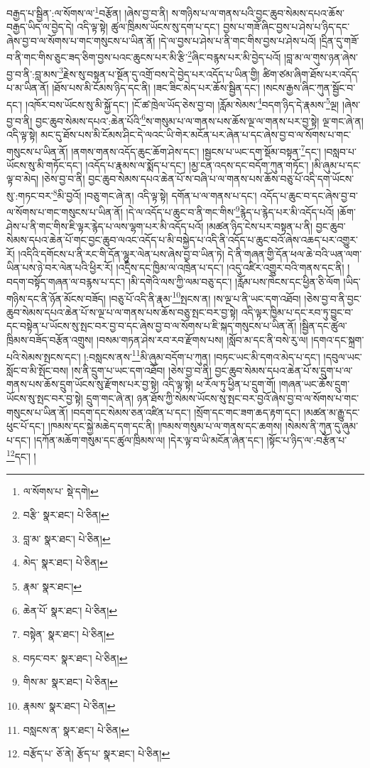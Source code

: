 བརྒྱད་པ་སྦྱིན་:ལ་སོགས་ལ་\footnote{ལ་སོགས་པ་  སྡེ་དགེ། }བརྩོན། །ཞེས་བྱ་བ་ནི། ས་གཉིས་པ་ལ་གནས་པའི་བྱང་ཆུབ་སེམས་དཔའ་ཆོས་བརྒྱད་ཡིད་ལ་བྱེད་དེ། འདི་ལྟ་སྟེ། ཚུལ་ཁྲིམས་ཡོངས་སུ་དག་པ་དང་། བྱས་པ་གཟོ་ཞིང་བྱས་པ་ཤེས་པ་ཉིད་དང་ཞེས་བྱ་བ་ལ་སོགས་པ་གང་གསུངས་པ་ཡིན་ནོ། །དེ་ལ་བྱས་པ་ཤེས་པ་ནི་གང་གིས་བྱས་པ་ཤེས་པའོ། །དྲིན་དུ་གཟོ་བ་ནི་གང་གིས་ཅུང་ཟད་ཅིག་བྱས་པའང་ཆུངས་པར་མི་རྩི་\footnote{བརྩི་  སྣར་ཐང་།  པེ་ཅིན། }ཞིང་བརྙས་པར་མི་བྱེད་པའོ། །བླ་མ་ལ་གུས་ཉན་ཞེས་བྱ་བ་ནི་:བླ་མས་\footnote{བླ་མ་  སྣར་ཐང་།  པེ་ཅིན། }རྗེས་སུ་བསྟན་པ་སྔོན་དུ་འགྲོ་བས་དེ་བྱེད་པར་འདོད་པ་ཡིན་གྱི། ཚིག་ཙམ་ཞིག་ཐོས་པར་འདོད་པ་མ་ཡིན་ནོ། །ཐོས་པས་མི་ངོམས་ཉིད་དང་ནི། །ཟང་ཟིང་མེད་པར་ཆོས་སྦྱིན་དང་། །སངས་རྒྱས་ཞིང་ཀུན་སྦྱོང་བ་དང་། །འཁོར་བས་ཡོངས་སུ་མི་སྐྱོ་དང་། །ངོ་ཚ་ཁྲེལ་ཡོད་ཅེས་བྱ་བ། །རློམ་སེམས་\footnote{མེད་  སྣར་ཐང་།  པེ་ཅིན། }བདག་ཉིད་དེ་རྣམས་\footnote{རྣམ་  སྣར་ཐང་། }ལྔ། །ཞེས་བྱ་བ་ནི། བྱང་ཆུབ་སེམས་དཔའ་:ཆེན་པོའི་\footnote{ཆེན་པོ་  སྣར་ཐང་།  པེ་ཅིན། }ས་གསུམ་པ་ལ་གནས་པས་ཆོས་ལྔ་ལ་གནས་པར་བྱ་སྟེ། ལྔ་གང་ཞེ་ན། འདི་ལྟ་སྟེ། མང་དུ་ཐོས་པས་མི་ངོམས་ཤིང་དེ་ལའང་ཡི་གེར་མངོན་པར་ཞེན་པ་དང་ཞེས་བྱ་བ་ལ་སོགས་པ་གང་གསུངས་པ་ཡིན་ནོ། །ནགས་གནས་འདོད་ཆུང་ཆོག་ཤེས་དང་། །སྦྱངས་པ་ཡང་དག་སྡོམ་བསྟན་\footnote{བསྟེན་  སྣར་ཐང་།  པེ་ཅིན། }དང་། །བསླབ་པ་ཡོངས་སུ་མི་གཏོང་དང་། །འདོད་པ་རྣམས་ལ་སྨོད་པ་དང་། །མྱ་ངན་འདས་དང་བདོག་ཀུན་གཏོང་། །མི་ཞུམ་པ་དང་ལྟ་བ་མེད། །ཅེས་བྱ་བ་ནི། བྱང་ཆུབ་སེམས་དཔའ་ཆེན་པོ་ས་བཞི་པ་ལ་གནས་པས་ཆོས་བཅུ་པོ་འདི་དག་ཡོངས་སུ་:གཏང་བར་\footnote{བཏང་བར་  སྣར་ཐང་།  པེ་ཅིན། }མི་བྱའོ། །བཅུ་གང་ཞེ་ན། འདི་ལྟ་སྟེ། དགོན་པ་ལ་གནས་པ་དང་། འདོད་པ་ཆུང་བ་དང་ཞེས་བྱ་བ་ལ་སོགས་པ་གང་གསུངས་པ་ཡིན་ནོ། །དེ་ལ་འདོད་པ་ཆུང་བ་ནི་གང་གིས་\footnote{གིས་མ་  སྣར་ཐང་།  པེ་ཅིན། }རྙེད་པ་རྙེད་པར་མི་འདོད་པའོ། །ཆོག་ཤེས་པ་ནི་གང་གིས་ཇི་ལྟར་རྙེད་པ་ལས་ལྷག་པར་མི་འདོད་པའོ། །མཚན་ཉིད་ངེས་པར་བསྟན་པ་ནི། བྱང་ཆུབ་སེམས་དཔའ་ཆེན་པོ་གང་བྱང་ཆུབ་ལའང་འདོད་པ་མི་བསྐྱེད་པ་འདི་ནི་འདོད་པ་ཆུང་བའོ་ཞེས་འཆད་པར་འགྱུར་རོ། །འདིའི་དགོངས་པ་ནི་རང་གི་དོན་ལྷུར་ལེན་པས་ཞེས་བྱ་བ་ཡིན་ཏེ། དེ་ནི་གཞན་གྱི་དོན་ཕལ་ཆེ་བའི་ཡན་ལག་ཡིན་པས་ཉེ་བར་ལེན་པའི་ཕྱིར་རོ། །འདྲིས་དང་ཁྱིམ་ལ་འཁྲེན་པ་དང་། །འདུ་འཛིར་འགྱུར་བའི་གནས་དང་ནི། །བདག་བསྟོད་གཞན་ལ་བརྙས་པ་དང་། །མི་དགེའི་ལས་ཀྱི་ལམ་བཅུ་དང་། །རློམ་པས་ཁེངས་དང་ཕྱིན་ཅི་ལོག །ཡིད་གཉིས་དང་ནི་ཉོན་མོངས་བཟོད། །བཅུ་པོ་འདི་ནི་རྣམ་\footnote{རྣམས་  སྣར་ཐང་།  པེ་ཅིན། }སྤངས་ན། །ས་ལྔ་པ་ནི་ཡང་དག་འཐོབ། །ཅེས་བྱ་བ་ནི་བྱང་ཆུབ་སེམས་དཔའ་ཆེན་པོ་ས་ལྔ་པ་ལ་གནས་པས་ཆོས་བཅུ་སྤང་བར་བྱ་སྟེ། འདི་ལྟར་ཁྱིམ་པ་དང་རབ་ཏུ་བྱུང་བ་དང་བསྟེན་པ་ཡོངས་སུ་སྤང་བར་བྱ་བ་དང་ཞེས་བྱ་བ་ལ་སོགས་པ་ཇི་སྐད་གསུངས་པ་ཡིན་ནོ། །སྦྱིན་དང་ཚུལ་ཁྲིམས་བཟོད་བརྩོན་འགྲུས། །བསམ་གཏན་ཤེས་རབ་རབ་རྫོགས་པས། །སློབ་མ་དང་ནི་བསེ་རུ་ལ། །དགའ་དང་སྐྲག་པའི་སེམས་སྤངས་དང་། །:བསླངས་ནས་\footnote{བསླངས་ན་  སྣར་ཐང་།  པེ་ཅིན། }མི་ཞུམ་བདོག་པ་ཀུན། །བཏང་ཡང་མི་དགའ་མེད་པ་དང་། །དབུལ་ཡང་སློང་བ་མི་སྤོང་བས། །ས་ནི་དྲུག་པ་ཡང་དག་འཐོབ། །ཅེས་བྱ་བ་ནི། བྱང་ཆུབ་སེམས་དཔའ་ཆེན་པོ་ས་དྲུག་པ་ལ་གནས་པས་ཆོས་དྲུག་ཡོངས་སུ་རྫོགས་པར་བྱ་སྟེ། འདི་ལྟ་སྟེ། ཕ་རོལ་ཏུ་ཕྱིན་པ་དྲུག་གོ། །གཞན་ཡང་ཆོས་དྲུག་ཡོངས་སུ་སྤང་བར་བྱ་སྟེ། དྲུག་གང་ཞེ་ན། ཉན་ཐོས་ཀྱི་སེམས་ཡོངས་སུ་སྤང་བར་བྱའོ་ཞེས་བྱ་བ་ལ་སོགས་པ་གང་གསུངས་པ་ཡིན་ནོ། །བདག་དང་སེམས་ཅན་འཛིན་པ་དང་། །སྲོག་དང་གང་ཟག་ཆད་རྟག་དང་། །མཚན་མ་རྒྱུ་དང་ཕུང་པོ་དང་། །ཁམས་དང་སྐྱེ་མཆེད་དག་དང་ནི། །ཁམས་གསུམ་པ་ལ་གནས་དང་ཆགས། །སེམས་ནི་ཀུན་དུ་ཞུམ་པ་དང་། །དཀོན་མཆོག་གསུམ་དང་ཚུལ་ཁྲིམས་ལ། །དེར་ལྟ་བ་ཡི་མངོན་ཞེན་དང་། །སྟོང་པ་ཉིད་ལ་:བརྩོན་པ་\footnote{བརྩོད་པ་  ཅོ་ནེ། རྩོད་པ་  སྣར་ཐང་།  པེ་ཅིན། }དང་། །
